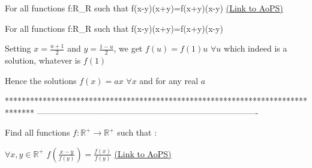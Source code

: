 \begin{problem}
	For all functions f:R_R such that f(x-y)(x+y)=f(x+y)(x-y)
	\flushright \href{https://artofproblemsolving.com/community/c6h474833}{(Link to AoPS)}
\end{problem}



\begin{solution}
	\begin{tcolorbox}For all functions f:R_R such that f(x-y)(x+y)=f(x+y)(x-y)\end{tcolorbox}
Setting $x=\frac{u+1}2$ and $y=\frac{1-u}2$, we get $f(u)=f(1)u$ $\forall u$ which indeed is a solution, whatever is $f(1)$

Hence the solutions $\boxed{f(x)=ax}$ $\forall x$ and for any real $a$
\end{solution}
*******************************************************************************
-------------------------------------------------------------------------------

\begin{problem}
	Find all functions $f:\mathbb{R^+} \to \mathbb{R^+}$ such that :

$\forall x,y\in \mathbb{R^+}$ $f(\frac{x-y}{f(y)})=\frac{f(x)}{f(y)}$
	\flushright \href{https://artofproblemsolving.com/community/c6h475122}{(Link to AoPS)}
\end{problem}



